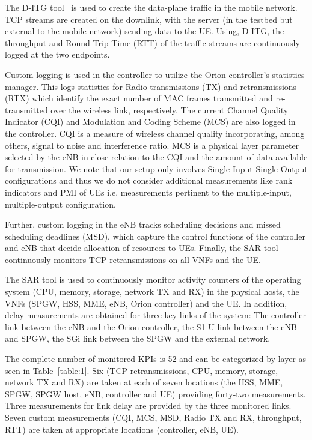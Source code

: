 \documentclass[journal,comsoc]{IEEEtran}
\begin{document}
% 
\begin{description}[style=unboxed,leftmargin=0cm]
\item[Service layer.] The D-ITG tool~\cite{ditg} is used to create the data-plane traffic in the mobile network. 
TCP streams are created on the downlink, with the server (in the testbed but external to the mobile network) sending data to the UE. 
Using, D-ITG, the throughput and Round-Trip Time (RTT) of the traffic streams are continuously logged at the two endpoints.

\item[Network Function layer.] Custom logging is used in the controller to utilize the Orion controller's statistics manager. 
This logs statistics for Radio transmissions (TX) and retransmissions (RTX) which identify the exact number of MAC frames transmitted and re-transmitted over the wireless link, respectively. 
The current Channel Quality Indicator (CQI) and Modulation and Coding Scheme (MCS) are also logged in the controller. CQI is a measure of wireless channel quality incorporating, among others, signal to noise and interference ratio.
MCS is a physical layer parameter selected by the eNB in close relation to the CQI and the amount of data available for transmission. 
We note that our setup only involves Single-Input Single-Output configurations and thus we do not consider additional measurements like rank indicators and PMI of UEs i.e. measurements pertinent to the multiple-input, multiple-output configuration.

Further, custom logging in the eNB tracks scheduling decisions and missed scheduling deadlines (MSD), which capture the control functions of the controller and eNB that decide allocation of resources to UEs.   
Finally, the SAR tool~\cite{sar} continuously monitors TCP retransmissions on all VNFs and the UE.

%
\item[Infrastructure layer.] The SAR tool is used to continuously monitor activity counters of the operating system (CPU, memory, storage, network TX and RX) in the physical hosts, the VNFs (SPGW, HSS, MME, eNB, Orion controller) and the UE. In addition, delay measurements are obtained for three key links of the system: The controller link between the eNB and the Orion controller, the S1-U link between the eNB and SPGW, the SGi link between the SPGW and the external network.
\end{description}

\medskip
The complete number of monitored KPIs is 52 and can be categorized by layer as seen in Table~\ref{table:1}. Six (TCP retransmissions, CPU, memory, storage, network TX and RX) are taken at each of seven locations (the HSS, MME, SPGW, SPGW host, eNB, controller and UE) providing forty-two measurements. Three measurements for link delay are provided by the three monitored links. Seven custom measurements (CQI, MCS, MSD, Radio TX and RX, throughput, RTT) are taken at appropriate locations (controller, eNB, UE).
\end{document}
